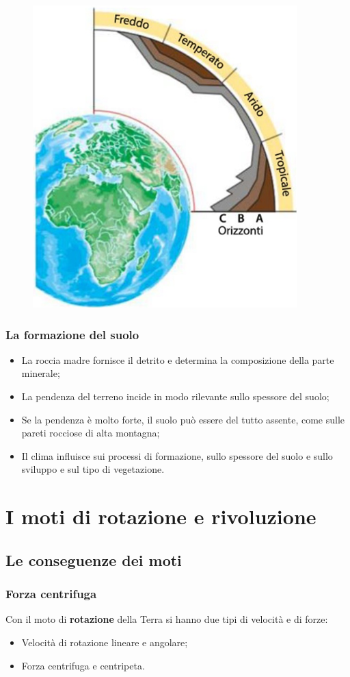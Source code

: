\documentclass{article}
\begin{document}
\begin{figure}[ht!]
    \begin{center}
        \includegraphics[width=.35\textwidth]{media/geo_fisica/profili_terra.png}
    \end{center}
\end{figure}

\subsubsection{La formazione del suolo}
\begin{itemize}
    \item La roccia madre fornisce il detrito e determina la composizione della parte minerale;
    \item La pendenza del terreno incide in modo rilevante sullo spessore del suolo;
    \item Se la pendenza è molto forte, il suolo può essere del tutto assente, come sulle pareti
        rocciose di alta montagna;
    \item Il clima influisce sui processi di formazione, sullo spessore del suolo e sullo
        sviluppo e sul tipo di vegetazione.
\end{itemize}

\newpage
\section{I moti di rotazione e rivoluzione}
\subsection{Le conseguenze dei moti}

\subsubsection{Forza centrifuga}
Con il moto di \textbf{rotazione} della Terra si hanno due tipi di velocità e di forze:
\begin{itemize}
    \item Velocità di rotazione lineare e angolare;
    \item Forza centrifuga e centripeta.
\end{itemize}
\end{document}

